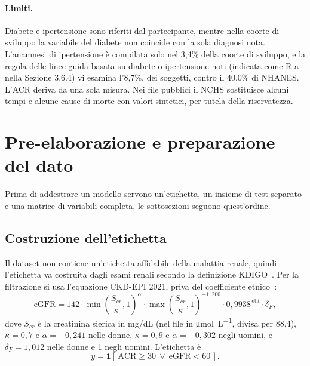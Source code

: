 \documentclass[a4paper, 12pt, oneside]{book}
\begin{document}
\paragraph{Limiti.} Diabete e ipertensione sono riferiti dal partecipante, mentre nella coorte di sviluppo la variabile del diabete non coincide con la sola diagnosi nota. L'anamnesi di ipertensione è compilata solo nel 3,4\% della coorte di sviluppo, e la regola delle linee guida basata su diabete o ipertensione noti (indicata come R-a nella Sezione 3.6.4) vi esamina l'8,7\%. dei soggetti, contro il 40,0\% di NHANES. L'ACR deriva da una sola misura. Nei file pubblici il NCHS sostituisce alcuni tempi e alcune cause di morte con valori sintetici, per tutela della riservatezza.

\section{Pre-elaborazione e preparazione del dato}

Prima di addestrare un modello servono un'etichetta, un insieme di test separato e una matrice di variabili completa, le sottosezioni seguono quest'ordine.

\subsection{Costruzione dell'etichetta}

Il dataset non contiene un'etichetta affidabile della malattia renale, quindi l'etichetta va costruita dagli esami renali secondo la definizione KDIGO~\cite{stevens_kdigo_2024}. Per la filtrazione si usa l'equazione CKD-EPI 2021, priva del coefficiente etnico~\cite{inker_new_2021}:
\begin{equation}
	\mathrm{eGFR} = 142 \cdot \min\!\left(\frac{S_{cr}}{\kappa},1\right)^{\alpha} \cdot \max\!\left(\frac{S_{cr}}{\kappa},1\right)^{-1{,}200} \cdot 0{,}9938^{\,\text{età}} \cdot \delta_F ,
	\label{eq:ckdepi}
\end{equation}
dove $S_{cr}$ è la creatinina sierica in mg/dL (nel file in \si{\micro\mole\per\liter}, divisa per 88,4), $\kappa = 0{,}7$ e $\alpha = -0{,}241$ nelle donne, $\kappa = 0{,}9$ e $\alpha = -0{,}302$ negli uomini, e $\delta_F = 1{,}012$ nelle donne e 1 negli uomini. L'etichetta è
\begin{equation}
	y = \mathbf{1}\left[\,\mathrm{ACR} \geq 30 \ \lor \ \mathrm{eGFR} < 60\,\right].
	\label{eq:target}
\end{equation}
\end{document}
